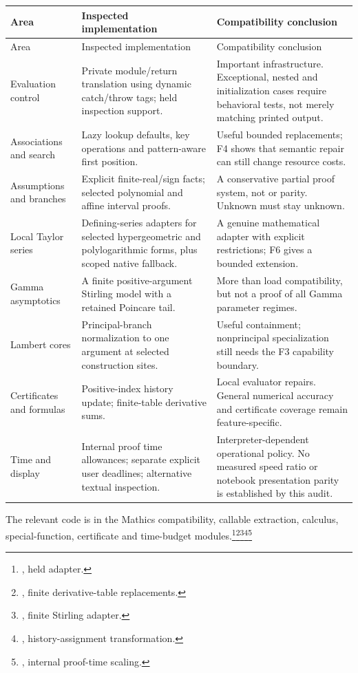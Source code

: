 \documentclass[11pt,letterpaper]{article}
\newcommand{\code}[1]{\texttt{\detokenize{#1}}}
\newcommand{\src}[2]{\footnote{\cite{#1}, #2.}}
\begin{document}
\begin{longtable}{P{.24\linewidth}P{.34\linewidth}P{.33\linewidth}}
\toprule
Area & Inspected implementation & Compatibility conclusion \\
\midrule\endfirsthead
\toprule Area & Inspected implementation & Compatibility conclusion \\
\midrule\endhead
Evaluation control & Private module/return translation using dynamic catch/throw tags; held inspection support. & Important infrastructure. Exceptional, nested and initialization cases require behavioral tests, not merely matching printed output. \\
Associations and search & Lazy lookup defaults, key operations and pattern-aware first position. & Useful bounded replacements; F4 shows that semantic repair can still change resource costs. \\
Assumptions and branches & Explicit finite-real/sign facts; selected polynomial and affine interval proofs. & A conservative partial proof system, not \code{Reduce} or \code{Resolve} parity. Unknown must stay unknown. \\
Local Taylor series & Defining-series adapters for selected hypergeometric and polylogarithmic forms, plus scoped native fallback. & A genuine mathematical adapter with explicit restrictions; F6 gives a bounded extension. \\
Gamma asymptotics & A finite positive-argument Stirling model with a retained Poincare tail. & More than load compatibility, but not a proof of all Gamma parameter regimes. \\
Lambert cores & Principal-branch normalization to one argument at selected construction sites. & Useful containment; nonprincipal specialization still needs the F3 capability boundary. \\
Certificates and formulas & Positive-index history update; finite-table derivative sums. & Local evaluator repairs. General numerical accuracy and certificate coverage remain feature-specific. \\
Time and display & Internal proof time allowances; separate explicit user deadlines; alternative textual inspection. & Interpreter-dependent operational policy. No measured speed ratio or notebook presentation parity is established by this audit. \\
\bottomrule
\end{longtable}

The relevant code is in the Mathics compatibility, callable extraction, calculus, special-function, certificate and time-budget modules.\src{mcalls}{held \code{Extract} adapter}\src{mcalculus}{finite derivative-table replacements}\src{mspecial}{finite \code{LogGamma} Stirling adapter}\src{mcertificate}{history-assignment transformation}\src{mtime}{internal proof-time scaling}
\end{document}
